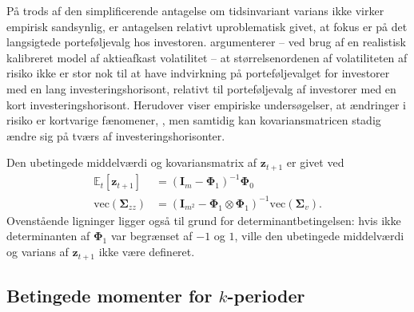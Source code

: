 \documentclass[
  a4paper,
  oneside]{memoir}
\begin{document}
\vspace{5mm}

På trods af den simplificerende antagelse om tidsinvariant varians ikke virker empirisk sandsynlig, er antagelsen relativt uproblematisk givet, at fokus er på det langsigtede porteføljevalg hos investoren. \citep{Chacko2005} argumenterer -- ved brug af en realistisk kalibreret model af aktieafkast volatilitet -- at størrelsenordenen af volatiliteten af risiko ikke er stor nok til at have indvirkning på porteføljevalget for investorer med en lang investeringshorisont, relativt til porteføljevalg af investorer med en kort investeringshorisont. Herudover viser empiriske undersøgelser, at ændringer i risiko er kortvarige fænomener, \citep{Camp1987}, men samtidig kan kovariansmatricen stadig ændre sig på tværs af investeringshorisonter.

\vspace{5mm}

Den ubetingede middelværdi og kovariansmatrix af \(\bm{z}_{t+1}\) er givet ved
\begin{align*}
        \mathbb{E}_t\left[\bm{z}_{t+1}\right] &= (\bm{I}_m-\bm{\Phi}_1)^{-1}\bm{\Phi}_0\\
        \text{vec}(\bm{\Sigma}_{zz}) &= (\bm{I}_{m^2}-\bm{\Phi}_1\otimes\bm{\Phi}_1)^{-1}\text{vec}(\bm{\Sigma}_v).
    \end{align*}
Ovenstående ligninger ligger også til grund for determinantbetingelsen: hvis ikke determinanten af \(\bm{\Phi}_1\) var begrænset af \(-1\) og \(1\), ville den ubetingede middelværdi og varians af \(\bm{z}_{t+1}\) ikke være defineret.

\subsection{Betingede momenter for $k$-perioder}
\end{document}
